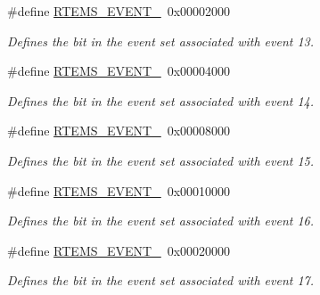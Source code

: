 \begin{DoxyCompactItemize}
\mbox{\label{group__ClassicEventSet_gadab2e575c5b836fcd51a2d50443fefea}} 
\#define \mbox{\hyperlink{group__ClassicEventSet_gadab2e575c5b836fcd51a2d50443fefea}{R\+T\+E\+M\+S\+\_\+\+E\+V\+E\+N\+T\+\_}}~0x00002000
\begin{DoxyCompactList}\small\item\em Defines the bit in the event set associated with event 13. \end{DoxyCompactList}\item 
\mbox{\label{group__ClassicEventSet_gab39384e5b927c56a666411ed848b15af}} 
\#define \mbox{\hyperlink{group__ClassicEventSet_gab39384e5b927c56a666411ed848b15af}{R\+T\+E\+M\+S\+\_\+\+E\+V\+E\+N\+T\+\_}}~0x00004000
\begin{DoxyCompactList}\small\item\em Defines the bit in the event set associated with event 14. \end{DoxyCompactList}\item 
\mbox{\label{group__ClassicEventSet_ga1908945fa930647fa74ced6f868eaf18}} 
\#define \mbox{\hyperlink{group__ClassicEventSet_ga1908945fa930647fa74ced6f868eaf18}{R\+T\+E\+M\+S\+\_\+\+E\+V\+E\+N\+T\+\_}}~0x00008000
\begin{DoxyCompactList}\small\item\em Defines the bit in the event set associated with event 15. \end{DoxyCompactList}\item 
\mbox{\label{group__ClassicEventSet_ga68a1de3c0f5a0898970e2ae50d25d626}} 
\#define \mbox{\hyperlink{group__ClassicEventSet_ga68a1de3c0f5a0898970e2ae50d25d626}{R\+T\+E\+M\+S\+\_\+\+E\+V\+E\+N\+T\+\_}}~0x00010000
\begin{DoxyCompactList}\small\item\em Defines the bit in the event set associated with event 16. \end{DoxyCompactList}\item 
\mbox{\label{group__ClassicEventSet_ga6c2ec5990a1ede8b72f5cadca090ebaf}} 
\#define \mbox{\hyperlink{group__ClassicEventSet_ga6c2ec5990a1ede8b72f5cadca090ebaf}{R\+T\+E\+M\+S\+\_\+\+E\+V\+E\+N\+T\+\_}}~0x00020000
\begin{DoxyCompactList}\small\item\em Defines the bit in the event set associated with event 17. \end{DoxyCompactList}\item 

\end{DoxyCompactItemize}
